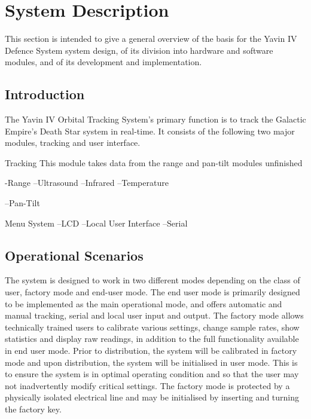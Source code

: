 \documentclass[]{report}
\begin{document}
\chapter{System Description}
This section is intended to give a general overview of the basis for the Yavin IV Defence System system design, of its division into hardware and software modules, and of its development and implementation.

\section{Introduction}

The Yavin IV Orbital Tracking System's primary function is to track the Galactic Empire's Death Star system in real-time. 
It consists of the following two major modules, tracking and user interface.


Tracking
This module takes data from the range and pan-tilt modules
unfinished

-Range
--Ultrasound 
--Infrared
--Temperature

--Pan-Tilt

Menu System
--LCD
--Local User Interface
--Serial

\section{Operational Scenarios}

The system is designed to work in two different modes depending on the class of user, factory mode and end-user mode.\newline
The end user mode is primarily designed to be implemented as the main operational mode, and offers automatic and manual tracking, serial and local user input and output. The factory mode allows technically trained users to calibrate various settings, change sample rates, show statistics and display raw readings, in addition to the full functionality available in end user mode.\newline
Prior to distribution, the system will be calibrated in factory mode and upon distribution, the system will be initialised in user mode. This is to ensure the system is in optimal operating condition and so that the user may not inadvertently modify critical settings. \newline
The factory mode is protected by a physically isolated electrical line and may be initialised by inserting and turning the factory key.
\end{document}
